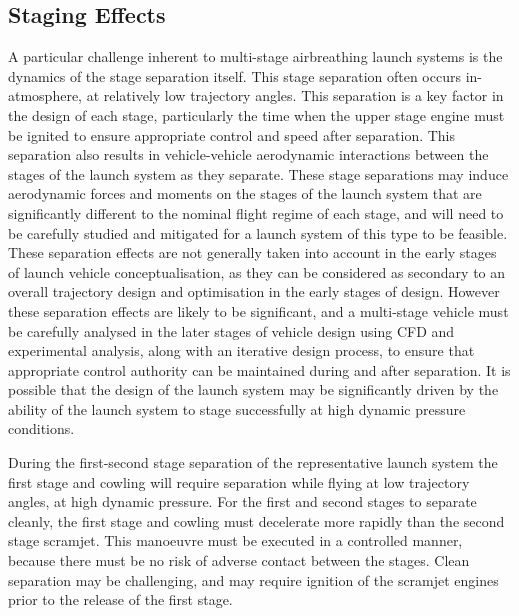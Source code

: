 	


\subsection{Staging Effects}\label{sec:stagingSimp}


A particular challenge inherent to multi-stage airbreathing launch systems is the dynamics of the stage separation itself. This stage separation often occurs in-atmosphere, at relatively low trajectory angles. This separation is a key factor in the design of each stage, particularly the time when the upper stage engine must be ignited to ensure appropriate control and speed after separation. This separation also results in vehicle-vehicle aerodynamic interactions between the stages of the launch system as they separate. These stage separations may induce aerodynamic forces and moments on the stages of the launch system that are significantly different to the nominal flight regime of each stage, and will need to be carefully studied and mitigated for a launch system of this type to be feasible\cite{mochammad,Kudo2005}. 
These separation effects are not generally taken into account in the early stages of launch vehicle conceptualisation, as they can be considered as secondary to an overall trajectory design and optimisation in the early stages of design.  %
However these separation effects are likely to be significant, and a multi-stage vehicle must be carefully analysed in the later stages of vehicle design using CFD and experimental analysis, along with an iterative design process, to ensure that appropriate control authority can be maintained during and after separation\cite{mochammad}. 
It is possible that the design of the launch system may be significantly driven by the ability of the launch system to stage successfully at high dynamic pressure conditions. 

During the first-second stage separation of the representative launch system the first stage and cowling will require separation while flying at low trajectory angles, at high dynamic pressure. For the first and second stages to separate cleanly, the first stage and cowling must decelerate more rapidly than the second stage scramjet. This manoeuvre must be executed in a controlled manner, because there must be no risk of adverse contact between the stages. Clean separation may be challenging, and may require ignition of the scramjet engines prior to the release of the first stage. 

